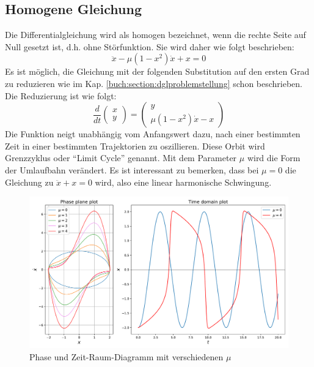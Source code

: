 \subsection{Homogene Gleichung
\label{vanderpol:subsection:homogene}}
Die Differentialgleichung wird als homogen bezeichnet, wenn die rechte Seite auf Null gesetzt ist, d.h. ohne Störfunktion. Sie wird daher wie folgt beschrieben:
\begin{equation}
	\ddot{x} - \mu \left(1-x^{2}\right)\dot{x}+x = 0
\label{vanderpol:equations:homogene}
\end{equation}
Es ist möglich, die Gleichung mit der folgenden Substitution auf den ersten Grad zu reduzieren wie im Kap. \ref{buch:section:dglproblemstellung} schon beschrieben. Die Reduzierung ist wie folgt:
\begin{equation}
\frac{d}{dt}\begin{pmatrix}x \\ y\end{pmatrix} = \begin{pmatrix}y \\ \mu \left(1-x^{2}\right)\dot{x}-x\end{pmatrix}
\label{vanderpol:equations:homogene_1}
\end{equation}
Die Funktion neigt unabhängig vom Anfangswert dazu, nach einer bestimmten Zeit in einer bestimmten Trajektorien zu oszillieren. Diese Orbit wird Grenzzyklus oder ``Limit Cycle'' genannt. Mit dem Parameter $\mu$ wird die Form der Umlaufbahn verändert. Es ist interessant zu bemerken, dass bei $\mu = 0$ die Gleichung zu $\ddot{x} + x = 0$ wird, also eine linear harmonische Schwingung.
\begin{figure}
	\centering
	\includegraphics[width=\textwidth]{papers/vanderpol/figures/homogene_plot.pdf}
	\caption{Phase und Zeit-Raum-Diagramm mit verschiedenen $\mu$\label{vanderpol:figures:homogene}}
\end{figure}

